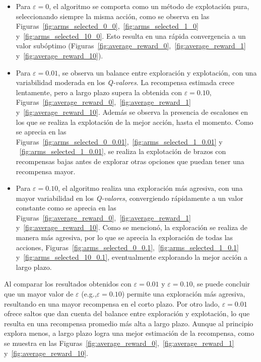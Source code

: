 \documentclass[12pt]{article}
\begin{document}
    \begin{itemize}
        \item Para $\varepsilon = 0$, el algoritmo se comporta como un método de explotación pura, seleccionando siempre la misma acción, como se observa en las Figuras~\ref{fig:arms_selected_0_0},~\ref{fig:arms_selected_1_0} y~\ref{fig:arms_selected_10_0}.
         Esto resulta en una rápida convergencia a un valor subóptimo (Figuras~\ref{fig:average_reward_0},~\ref{fig:average_reward_1} y~\ref{fig:average_reward_10}).

        \item Para $\varepsilon = 0.01$, se observa un balance entre exploración y explotación, con una variabilidad moderada en los \textit{Q-valores}.
        La recompensa estimada crece lentamente, pero a largo plazo supera la obtenida con $\varepsilon = 0.10$, Figuras~\ref{fig:average_reward_0},~\ref{fig:average_reward_1} y~\ref{fig:average_reward_10}.
        Además se observa la presencia de escalones en los que se realiza la explotación de la mejor acción, hasta el momento.
        Como se aprecia en las Figuras~\ref{fig:arms_selected_0_0.01},~\ref{fig:arms_selected_1_0.01} y ~\ref{fig:arms_selected_1_0.01}, se realiza la explotación de brazos con recompensas bajas antes de explorar otras opciones que puedan tener una recompensa mayor.

        \item Para $\varepsilon = 0.10$, el algoritmo realiza una exploración más agresiva, con una mayor variabilidad en los \textit{Q-valores}, convergiendo rápidamente a un valor constante como se aprecia en las Figuras~\ref{fig:average_reward_0},~\ref{fig:average_reward_1} y~\ref{fig:average_reward_10}.
        Como se mencionó, la exploración se realiza de manera más agresiva, por lo que se aprecia la exploración de todas las acciones, Figuras~\ref{fig:arms_selected_0_0.1},~\ref{fig:arms_selected_1_0.1} y~\ref{fig:arms_selected_10_0.1}, eventualmente explorando la mejor acción a largo plazo.
    \end{itemize}

    Al comparar los resultados obtenidos con $\varepsilon = 0.01$ y $\varepsilon = 0.10$, se puede concluir que un mayor valor de $\varepsilon$ (e.g.,$\varepsilon = 0.10$) permite una exploración más agresiva, resultando en una mayor recompensa en el corto plazo.
    Por otro lado, $\varepsilon = 0.01$ ofrece saltos que dan cuenta del balance entre exploración y explotación, lo que resulta en una recompensa promedio más alta a largo plazo.
    Aunque al principio explora menos, a largo plazo logra una mejor estimación de la recompensa, como se muestra en las  Figuras~\ref{fig:average_reward_0},~\ref{fig:average_reward_1} y~\ref{fig:average_reward_10}.
\end{document}
